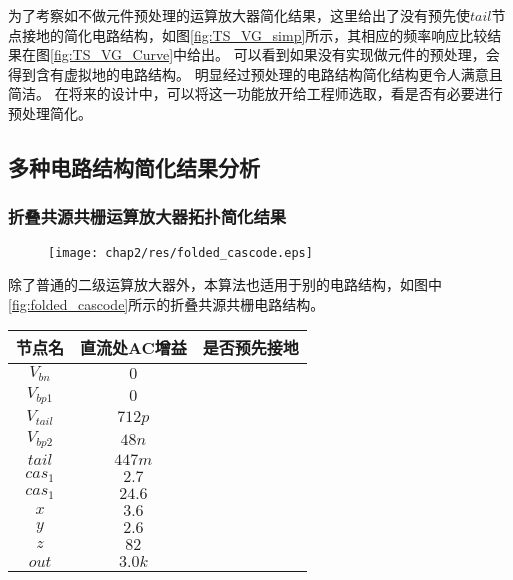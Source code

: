 为了考察如不做元件预处理的运算放大器简化结果，这里给出了没有预先使$tail$节点接地的简化电路结构，如图\ref{fig:TS_VG_simp}所示，其相应的频率响应比较结果在图\ref{fig:TS_VG_Curve}中给出。
可以看到如果没有实现做元件的预处理，会得到含有虚拟地的电路结构。
明显经过预处理的电路结构简化结构更令人满意且简洁。
在将来的设计中，可以将这一功能放开给工程师选取，看是否有必要进行预处理简化。

\subsection{多种电路结构简化结果分析}
\label{subsec:simp:res:cir}

\subsubsection{折叠共源共栅运算放大器拓扑简化结果}
\label{subsubsec:simp:res:cir:fd}

\begin{figure}[!htp]
	\centering
	\texttt{[image: chap2/res/folded\_cascode.eps]}
\end{figure}

除了普通的二级运算放大器外，本算法也适用于别的电路结构，如图中\ref{fig:folded_cascode}所示的折叠共源共栅电路结构。

\begin{table}[!htbp]
	\centering
	\begin{tabular}{c|c|c}
		\hline
		   节点名     & 直流处AC增益 &   是否预先接地   \\ \hline
		 $V_{bn}$  &   $0$   & \checkmark \\
		$V_{bp1}$  &   $0$   & \checkmark \\
		$V_{tail}$ & $712p$  & \checkmark \\
		$V_{bp2}$  &  $48n$  & \checkmark \\
		  $tail$   & $447m$  & \checkmark \\
		 $cas_1$   &  $2.7$  & \texttimes \\
		 $cas_1$   & $24.6$  & \texttimes \\
		   $x$     &  $3.6$  & \texttimes \\
		   $y$     &  $2.6$  & \texttimes \\
		   $z$     &  $82$   & \texttimes \\
		  $out$    & $3.0k$  & \texttimes \\ \hline
	\end{tabular}
\end{table}

